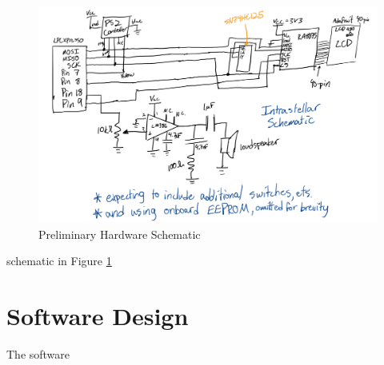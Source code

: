 \documentclass[a4paper, 12pt]{article}
\begin{document}
\begin{figure}[h!]
  \centering
  \includegraphics[scale=.6]{schematic.png}
  \caption{Preliminary Hardware Schematic}
  \label{fig:schematic}
\end{figure}

schematic in Figure \ref{fig:schematic}


\section*{Software Design}
The software

\end{document}
